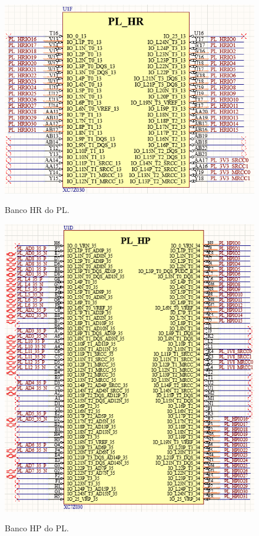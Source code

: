 \begin{figure}[H]
    \centering
    \caption{Banco HR do PL.}
    \includegraphics[scale=0.8]{images/plhr.png}
    \label{fig:plhr}
\end{figure}

\begin{figure}[H]
    \centering
    \caption{Banco HP do PL.}
    \includegraphics[scale=0.7]{images/plhp.png}
    \label{fig:plhp}
\end{figure}

